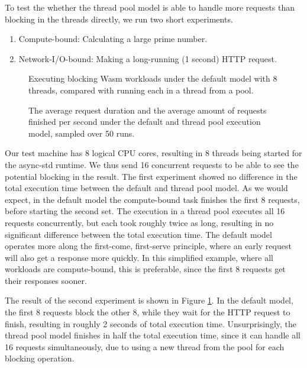 To test the whether the thread pool model is able to handle more requests than blocking in the threads directly, we run two short experiments.

\begin{enumerate}
    \item Compute-bound: Calculating a large prime number.
    \item Network-I/O-bound: Making a long-running (1 second) HTTP request.
\end{enumerate}

\begin{figure}
    \begin{center}
        
    \end{center}
    \caption{Executing blocking Wasm workloads under the  default model with 8 threads, compared with running each in a thread from a pool.}
    \label{fig:default_vs_thread_pool}
\end{figure}

\begin{figure}
    \begin{center}
        
    \end{center}
    \caption{The average request duration and the average amount of requests finished per second under the default and thread pool execution model, sampled over 50 runs.}
    \label{fig:default_vs_thread_pool_mixed}
\end{figure}

Our test machine has 8 logical CPU cores, resulting in 8 threads being started for the async-std runtime. We thus send 16 concurrent requests to be able to see the potential blocking in the result. The first experiment showed no difference in the total execution time between the default and thread pool model. As we would expect, in the default model the compute-bound task finishes the first 8 requests, before starting the second set. The execution in a thread pool executes all 16 requests concurrently, but each took roughly twice as long, resulting in no significant difference between the total execution time. The default model operates more along the first-come, first-serve principle, where an early request will also get a response more quickly. In this simplified example, where all workloads are compute-bound, this is preferable, since the first 8 requests get their responses sooner.

The result of the second experiment is shown in Figure \ref{fig:default_vs_thread_pool}. In the default model, the first 8 requests block the other 8, while they wait for the HTTP request to finish, resulting in roughly 2 seconds of total execution time. Unsurprisingly, the thread pool model finishes in half the total execution time, since it can handle all 16 requests simultaneously, due to using a new thread from the pool for each blocking operation.

